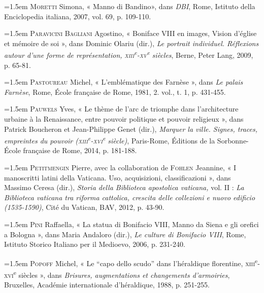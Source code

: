 \documentclass[12pt,twoside,openany]{book}
\newenvironment{PurhBibliography}
  {%
    \par
    \setlength{\parindent}{0pt}%
    \setlength{\leftskip}{0pt}%
  }
  {%
    \par
  }
\begin{document}
\begin{PurhBibliography}
\noindent\hangindent=1.5em \textsc{Moretti} Simona, « Manno di Bandino», dans \textit{DBI}, Rome, Istituto della Enciclopedia italiana, 2007, vol. 69, p. 109-110.\par
\noindent\hangindent=1.5em \textsc{Paravicini Bagliani} Agostino, « Boniface \textsc{VIII} en images, Vision d’église et mémoire de soi », dans Dominic Olariu (dir.), \textit{Le portrait individuel. Réflexions autour d’une forme de représentation, }\textit{\textsc{xiii}}\textit{\textsuperscript{e}}\textit{-}\textit{\textsc{xv}}\textit{\textsuperscript{e}}\textit{ siècles}, Berne, Peter Lang, 2009, p. 65-81.\par
\noindent\hangindent=1.5em \textsc{Pastoureau} Michel, « L’emblématique des Farnèse », dans \textit{Le palais Farnèse}, Rome, École française de Rome, 1981, 2. vol., t. 1, p. 431-455.\par
\noindent\hangindent=1.5em \textsc{Pauwels} Yves, « Le thème de l’arc de triomphe dans l’architecture urbaine à la Renaissance, entre pouvoir politique et pouvoir religieux », dans Patrick Boucheron et Jean-Philippe Genet (dir.), \textit{Marquer la ville. Signes, traces, empreintes du pouvoir (}\textit{\textsc{xiii}}\textit{\textsuperscript{e}}\textit{-}\textit{\textsc{xvi}}\textit{\textsuperscript{e}}\textit{ siècle)}, Paris-Rome, Éditions de la Sorbonne-École française de Rome, 2014, p. 181-188.\par
\noindent\hangindent=1.5em \textsc{Petitmengin} Pierre, avec la collaboration de \textsc{Fohlen} Jeannine, « I manoscritti latini della Vaticana. Uso, acquisizioni, classificazioni », dans Massimo Ceresa (dir.), \textit{Storia della Biblioteca apostolica vaticana, }vol. II :\textit{ La Biblioteca vaticana tra riforma cattolica, crescita delle collezioni e nuovo edificio (1535-1590)}, Cité du Vatican, BAV, 2012, p. 43-90.\par
\noindent\hangindent=1.5em \textsc{Pini} Raffaella, « La statua di Bonifacio \textsc{VIII}, Manno da Siena e gli orefici a Bologna », dans Maria Andaloro (dir.), \textit{Le culture di Bonifacio VIII}, Rome, Istituto Storico Italiano per il Medioevo, 2006, p. 231-240.\par
\noindent\hangindent=1.5em \textsc{Popoff} Michel, « Le “capo dello scudo” dans l’héraldique florentine, \textsc{xiii}\textsuperscript{e}\textsc{-xvi}\textsuperscript{e }siècles », dans \textit{Brisures, augmentations et changements d'armoiries}, Bruxelles, Académie internationale d’héraldique, 1988, p. 251-255.\par

\end{PurhBibliography}
\end{document}
